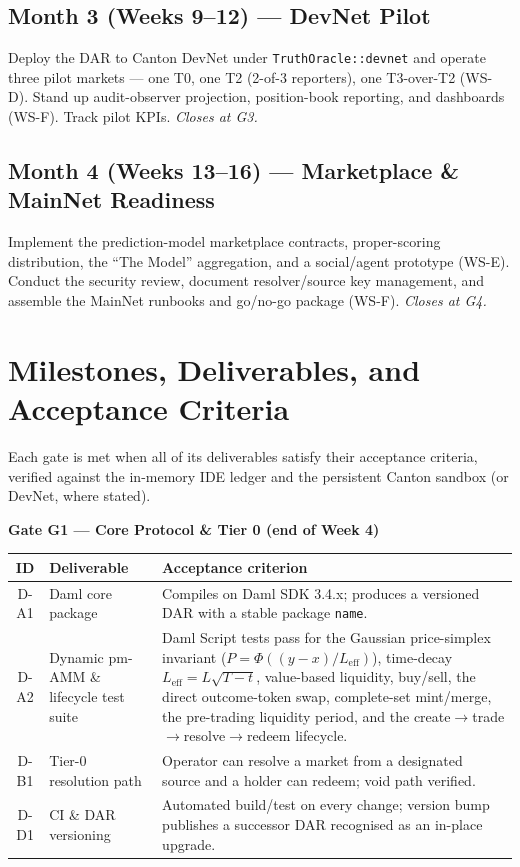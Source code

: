 \documentclass[11pt,a4paper]{article}
\begin{document}
\subsection*{Month 3 (Weeks 9--12) --- DevNet Pilot}
Deploy the DAR to Canton DevNet under \texttt{TruthOracle::devnet} and operate three pilot markets --- one T0, one T2 (2-of-3 reporters), one T3-over-T2 (WS-D). Stand up audit-observer projection, position-book reporting, and dashboards (WS-F). Track pilot KPIs. \emph{Closes at G3.}

\subsection*{Month 4 (Weeks 13--16) --- Marketplace \& MainNet Readiness}
Implement the prediction-model marketplace contracts, proper-scoring distribution, the ``The Model'' aggregation, and a social/agent prototype (WS-E). Conduct the security review, document resolver/source key management, and assemble the MainNet runbooks and go/no-go package (WS-F). \emph{Closes at G4.}

\section{Milestones, Deliverables, and Acceptance Criteria}
\label{sec:milestones}

Each gate is met when all of its deliverables satisfy their acceptance criteria, verified against the in-memory IDE ledger and the persistent Canton sandbox (or DevNet, where stated).

\renewcommand{\arraystretch}{1.25}

\noindent\textbf{Gate G1 --- Core Protocol \& Tier 0 (end of Week 4)}
\begin{center}
\begin{tabularx}{\linewidth}{c R{4.2cm} Y}
\toprule
\textbf{ID} & \textbf{Deliverable} & \textbf{Acceptance criterion} \\
\midrule
D-A1 & Daml core package & Compiles on Daml SDK 3.4.x; produces a versioned DAR with a stable package \texttt{name}. \\
D-A2 & Dynamic pm-AMM \& lifecycle test suite & Daml Script tests pass for the Gaussian price-simplex invariant ($P=\Phi((y-x)/L_{\mathrm{eff}})$), time-decay $L_{\mathrm{eff}}=L\sqrt{T-t}$, value-based liquidity, buy/sell, the direct outcome-token swap, complete-set mint/merge, the pre-trading liquidity period, and the create$\rightarrow$trade$\rightarrow$resolve$\rightarrow$redeem lifecycle. \\
D-B1 & Tier-0 resolution path & Operator can resolve a market from a designated source and a holder can redeem; void path verified. \\
D-D1 & CI \& DAR versioning & Automated build/test on every change; version bump publishes a successor DAR recognised as an in-place upgrade. \\
\bottomrule
\end{tabularx}
\end{center}
\end{document}
